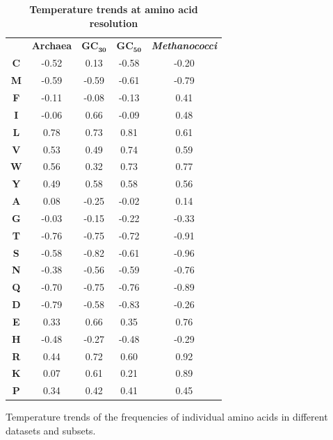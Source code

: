 \documentclass[10pt,letterpaper]{article}
\begin{document}
\begin{table}[!ht]
	\caption{\bf{Temperature trends at amino acid resolution}}
	\begin{tabular}{|c|c|c|c|c|}
		{} &   {\bf Archaea} &  $\mathbf{GC_{30}}$ &   $\mathbf{GC_{50}}$ &  {\it\bf Methanococci} \\
		{\bf C} &    -0.52 &  0.13 & -0.58 &         -0.20 \\
		{\bf M} &    -0.59 & -0.59 & -0.61 &         -0.79 \\
		{\bf F} &    -0.11 & -0.08 & -0.13 &          0.41 \\
		{\bf I} &    -0.06 &  0.66 & -0.09 &          0.48 \\
		{\bf L} &     0.78 &  0.73 &  0.81 &          0.61 \\
		{\bf V} &     0.53 &  0.49 &  0.74 &          0.59 \\
		{\bf W} &     0.56 &  0.32 &  0.73 &          0.77 \\
		{\bf Y} &     0.49 &  0.58 &  0.58 &          0.56 \\
		{\bf A} &     0.08 & -0.25 & -0.02 &          0.14 \\
		{\bf G} &    -0.03 & -0.15 & -0.22 &         -0.33 \\
		{\bf T} &    -0.76 & -0.75 & -0.72 &         -0.91 \\
		{\bf S} &    -0.58 & -0.82 & -0.61 &         -0.96 \\
		{\bf N} &    -0.38 & -0.56 & -0.59 &         -0.76 \\
		{\bf Q} &    -0.70 & -0.75 & -0.76 &         -0.89 \\
		{\bf D} &    -0.79 & -0.58 & -0.83 &         -0.26 \\
		{\bf E} &     0.33 &  0.66 &  0.35 &          0.76 \\
		{\bf H} &    -0.48 & -0.27 & -0.48 &         -0.29 \\
		{\bf R} &     0.44 &  0.72 &  0.60 &          0.92 \\
		{\bf K} &     0.07 &  0.61 &  0.21 &          0.89 \\
		{\bf P} &     0.34 &  0.42 &  0.41 &          0.45 \\		%
	\end{tabular}
	\begin{flushleft} Temperature trends of the frequencies of individual amino acids in different datasets and subsets. 
	\end{flushleft}
	\label{tab:correlations}
\end{table}
\end{document}
